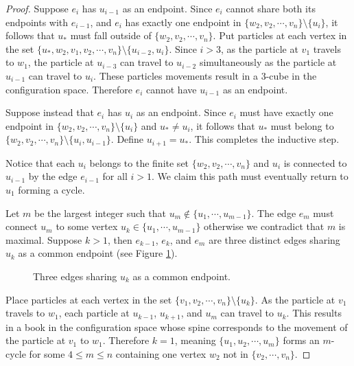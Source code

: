 \begin{proof}
    Suppose \(e_i\) has \(u_{i-1}\) as an endpoint.
    Since \(e_i\) cannot share both its endpoints with \(e_{i-1}\), and
    \(e_i\) has exactly one endpoint in \(\{w_2, v_2, \cdots, v_n\}\setminus\{u_i\}\),
    it follows that \(u_*\) must fall outside of \(\{w_2, v_2, \cdots, v_n\}\).
    Put particles at each vertex in the set \(\{u_*, w_2, v_1, v_2, \cdots, v_n\}\setminus\{u_{i-2}, u_i\}\).
    Since \(i > 3\), as the particle at \(v_1\) travels to \(w_1\),
    the particle at \(u_{i-3}\) can travel to \(u_{i-2}\) simultaneously as the particle
    at \(u_{i-1}\) can travel to \(u_i\).
    These particles movements result in a \(3\)-cube in the configuration space.
    Therefore \(e_i\) cannot have \(u_{i-1}\) as an endpoint.
    
    Suppose instead that \(e_i\) has \(u_i\) as an endpoint.
    Since \(e_i\) must have exactly one endpoint in \(\{w_2, v_2, \cdots, v_n\}\setminus\{u_i\}\) and \(u_* \neq u_i\),
    it follows that \(u_*\) must belong to \(\{w_2, v_2, \cdots, v_n\}\setminus\{u_i, u_{i-1}\}\).
    Define \(u_{i+1} = u_*\).
    This completes the inductive step.
    
    Notice that each \(u_i\) belongs to the finite set \(\{w_2, v_2, \cdots, v_n\}\)
    and \(u_i\) is connected to \(u_{i-1}\) by the edge \(e_{i-1}\) for all \(i > 1\).
    We claim this path must eventually return to \(u_1\) forming a cycle.

    Let \(m\) be the largest integer such that \(u_m \not \in \{u_1, \cdots, u_{m-1}\}\).
    The edge \(e_m\) must connect \(u_m\) to some vertex \(u_k \in \{u_1, \cdots, u_{m-1}\}\)
    otherwise we contradict that \(m\) is maximal.
    Suppose \(k > 1\), then \(e_{k-1}\), \(e_k\), and \(e_m\) are three distinct
    edges sharing \(u_k\) as a common endpoint (see Figure \ref{fig:lem:is_surface_2_6}).

    \begin{figure}[h!]
        \centering
        \caption{Three edges sharing \(u_k\) as a common endpoint.}
        \label{fig:lem:is_surface_2_6}
    \end{figure}

    Place particles at each vertex in the set \(\{v_1, v_2, \cdots, v_n\}\setminus\{u_k\}\).
    As the particle at \(v_1\) travels to \(w_1\),
    each particle at \(u_{k-1}\), \(u_{k+1}\), and \(u_m\) can travel to \(u_k\).
    This results in a book in the configuration space whose spine corresponds to the movement of the particle at \(v_1\) to \(w_1\).
    Therefore \(k = 1\), meaning \(\{u_1, u_2, \cdots, u_m\}\) forms an \(m\)-cycle for some \(4 \le m \le n\)
    containing one vertex \(w_2\) not in \(\{v_2, \cdots, v_n\}\).
\end{proof}

